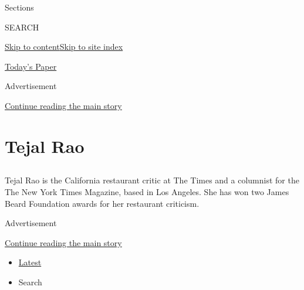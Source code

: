 Sections

SEARCH

\protect\hyperlink{site-content}{Skip to
content}\protect\hyperlink{site-index}{Skip to site index}

\href{https://myaccount.nytimes.com/auth/login?response_type=cookie\&client_id=vi}{}

\href{https://www.nytimes.com/section/todayspaper}{Today's Paper}

Advertisement

\protect\hyperlink{after-top}{Continue reading the main story}

\hypertarget{tejal-rao}{%
\section{Tejal Rao}\label{tejal-rao}}

\subsection{}

Tejal Rao is the California restaurant critic at The Times and a
columnist for the The New York Times Magazine, based in Los Angeles. She
has won two James Beard Foundation awards for her restaurant criticism.

Advertisement

\protect\hyperlink{after-mid1}{Continue reading the main story}

\begin{itemize}
\tightlist
\item
  \protect\hyperlink{stream-panel}{Latest}
\item
  Search
\end{itemize}

